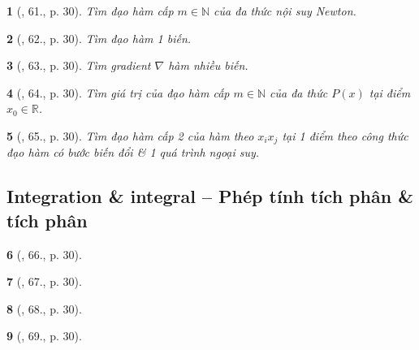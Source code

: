 \documentclass{article}
\newtheorem{baitoan}{}
\begin{document}
\begin{baitoan}[\cite{Doanh_Tuan_Pascal}, 61., p. 30]
	Tìm đạo hàm cấp $m\in\mathbb{N}$ của đa thức nội suy Newton.
\end{baitoan}

\begin{baitoan}[\cite{Doanh_Tuan_Pascal}, 62., p. 30]
	Tìm đạo hàm 1 biến.
\end{baitoan}

\begin{baitoan}[\cite{Doanh_Tuan_Pascal}, 63., p. 30]
	Tìm gradient $\nabla$ hàm nhiều biến.
\end{baitoan}

\begin{baitoan}[\cite{Doanh_Tuan_Pascal}, 64., p. 30]
	Tìm giá trị của đạo hàm cấp $m\in\mathbb{N}$ của đa thức $P(x)$ tại điểm $x_0\in\mathbb{R}$.
\end{baitoan}

\begin{baitoan}[\cite{Doanh_Tuan_Pascal}, 65., p. 30]
	Tìm đạo hàm cấp 2 của hàm theo $x_ix_j$ tại 1 điểm theo công thức đạo hàm có bước biến đổi \& 1 quá trình ngoại suy.
\end{baitoan}


\subsection{Integration \& integral -- Phép tính tích phân \& tích phân}

\begin{baitoan}[\cite{Doanh_Tuan_Pascal}, 66., p. 30]
	
\end{baitoan}

\begin{baitoan}[\cite{Doanh_Tuan_Pascal}, 67., p. 30]
	
\end{baitoan}

\begin{baitoan}[\cite{Doanh_Tuan_Pascal}, 68., p. 30]
	
\end{baitoan}

\begin{baitoan}[\cite{Doanh_Tuan_Pascal}, 69., p. 30]
	
\end{baitoan}

\end{document}
